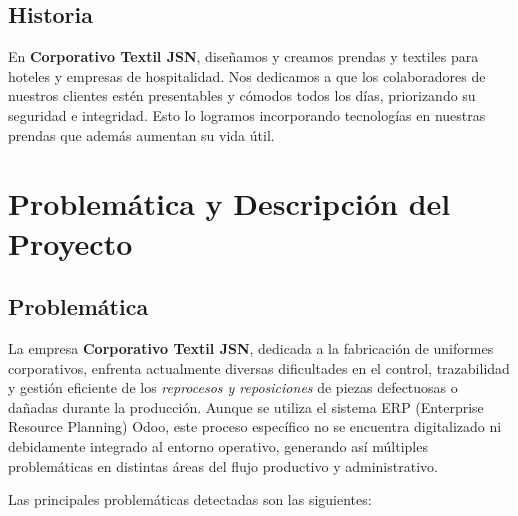 \documentclass[12pt,letterpaper,spanish]{report}
\begin{document}
\section{Historia}
En \textbf{Corporativo Textil JSN}, diseñamos y creamos prendas y textiles para hoteles y empresas de hospitalidad.
Nos dedicamos a que los colaboradores de nuestros clientes estén presentables y cómodos todos los días, priorizando su seguridad e integridad.
Esto lo logramos incorporando tecnologías en nuestras prendas que además aumentan su vida útil.


\newpage




\chapter{Problemática y Descripción del Proyecto}
\newpage

\section{Problemática}

La empresa \textbf{Corporativo Textil JSN}, dedicada a la fabricación de uniformes corporativos, enfrenta actualmente diversas dificultades en el control, trazabilidad y gestión eficiente de los \textit{reprocesos y reposiciones} de piezas defectuosas o dañadas durante la producción. Aunque se utiliza el sistema ERP (Enterprise Resource Planning) Odoo, este proceso específico no se encuentra digitalizado ni debidamente integrado al entorno operativo, generando así múltiples problemáticas en distintas áreas del flujo productivo y administrativo.

Las principales problemáticas detectadas son las siguientes:
\end{document}
